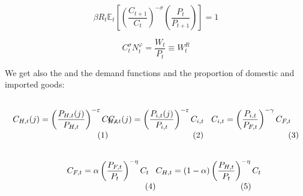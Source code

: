 \documentclass{article}
\newcommand{\Et}{\mathbb{E}_t}
\begin{document}
\begin{minipage}{0.49\textwidth}
    \begin{equation}
        \label{euler}
        \beta R_t \Et\left[\left(\frac{C_{t+1}}{C_t} \right)^{-\sigma} \left(\frac{P_t}{P_{t+1}} \right) \right] = 1
    \end{equation}
\end{minipage}
\begin{minipage}{0.49\textwidth}
    \begin{equation}
        \label{labour_supply}
        C_t^\sigma N_t^\varphi = \frac{W_t}{P_t} \equiv W_t^R
    \end{equation}
\end{minipage}

\vspace{6pt}
We get also the and the demand functions and the proportion of domestic and imported goods:

\begin{subequations}
    \begin{minipage}{0.33\textwidth}
        \label{demand_eqs}
        \begin{align}
            C_{H,t}(j) = \left( {\frac{P_{H,t}(j)}{P_{H,t}}} \right)^{-\varepsilon}C_{H,t} \label{Chj_demand}
        \end{align}
    \end{minipage}
    \begin{minipage}{0.33\textwidth}
        \begin{align}
            C_{i,t}(j) = \left( {\frac{P_{i,t}(j)}{P_{i,t}}} \right)^{-\varepsilon}C_{i,t} \label{Cij_demand}
        \end{align}
    \end{minipage}
    \begin{minipage}{0.33\textwidth}
        \begin{align}
            C_{i,t} = \left( {\frac{P_{i,t}}{P_{F,t}}} \right)^{-\gamma}C_{F,t}\label{Ci_demand}
        \end{align}
    \end{minipage}
\end{subequations}

\begin{subequations}
    \begin{minipage}{0.33\textwidth}
        \label{Cf_demand}
        \begin{align}
            C_{F,t} = \alpha \left( \frac{P_{F,t}}{P_t} \right)^{-\eta}C_t
        \end{align}
    \end{minipage}
    \begin{minipage}{0.33\textwidth}
        \label{Ch_demand}
        \begin{align}
            C_{H,t} = (1-\alpha)\left( \frac{P_{H,t}}{P_t} \right)^{-\eta}C_t
        \end{align}
\end{minipage}
\end{subequations}
\end{document}
